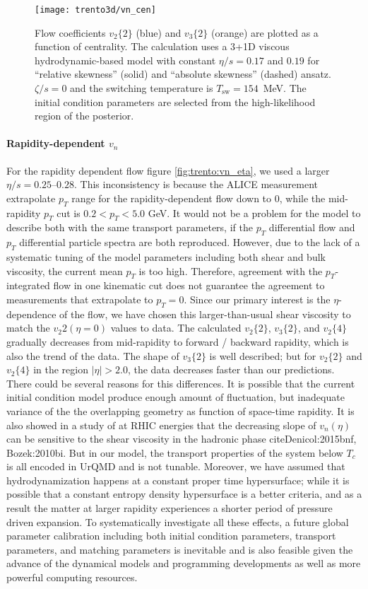 \begin{figure}
\centering
\texttt{[image: trento3d/vn\_cen]}
\caption{Flow coefficients $v_2\{2\}$ (blue) and $v_3\{2\}$ (orange) are plotted as a function of centrality. The calculation uses a 3+1D viscous hydrodynamic-based model with constant $\eta/s=0.17$ and $0.19$ for ``relative skewness'' (solid) and ``absolute skewness'' (dashed) ansatz. $\zeta/s=0$ and the switching temperature is $T_\text{sw}=154$~MeV.
The initial condition parameters are selected from the high-likelihood region of the posterior.}
\label{fig:trento:vn_cen}
\end{figure}

\paragraph{Rapidity-dependent $v_n$} For the rapidity dependent flow figure \ref{fig:trento:vn_eta}, we used a larger $\eta/s=0.25$--$0.28$. 
This inconsistency is because the ALICE measurement extrapolate $p_T$ range for the rapidity-dependent flow down to 0, while the mid-rapidity  $p_T$ cut is $0.2 < p_T < 5.0$ GeV.
It would not be a problem for the model to describe both with the same transport parameters, if the $p_T$ differential flow and $p_T$ differential particle spectra are both reproduced.
However, due to the lack of a systematic tuning of the model parameters including both shear and bulk viscosity, the current mean $p_T$ is too high.
Therefore, agreement with the $p_T$-integrated flow in one kinematic cut does not guarantee the agreement to measurements that extrapolate to $p_T = 0$.
Since our primary interest is the $\eta$-dependence of the flow, we have chosen this larger-than-usual shear viscosity to match the $v_2{2}(\eta=0)$ values to data.
The calculated $v_2\{2\}$, $v_3\{2\}$, and $v_2\{4\}$ gradually decreases from mid-rapidity to forward / backward rapidity, which is also the trend of the data.
The shape of $v_3\{2\}$ is well described; but for $v_2\{2\}$ and $v_2\{4\}$ in the region $|\eta| > 2.0$, the data decreases faster than our predictions.
There could be several reasons for this differences.
It is possible that the current initial condition model produce enough amount of fluctuation, but inadequate variance of the the overlapping geometry as function of space-time rapidity.
It is also showed in a study of at RHIC energies that the decreasing slope of $v_n(\eta)$ can be sensitive to the shear viscosity in the hadronic phase cite{Denicol:2015bnf, Bozek:2010bi}.
But in our model, the transport properties of the system below $T_c$ is all encoded in UrQMD and is not tunable. 
Moreover, we have assumed that hydrodynamization happens at a constant proper time hypersurface;
while it is possible that a constant entropy density hypersurface is a better criteria, and as a result the matter at larger rapidity experiences a shorter period of pressure driven expansion.
To systematically investigate all these effects, a future global parameter calibration including both initial condition parameters, transport parameters, and matching parameters is inevitable and is also feasible given the advance of the dynamical models and programming developments as well as more powerful computing resources.

